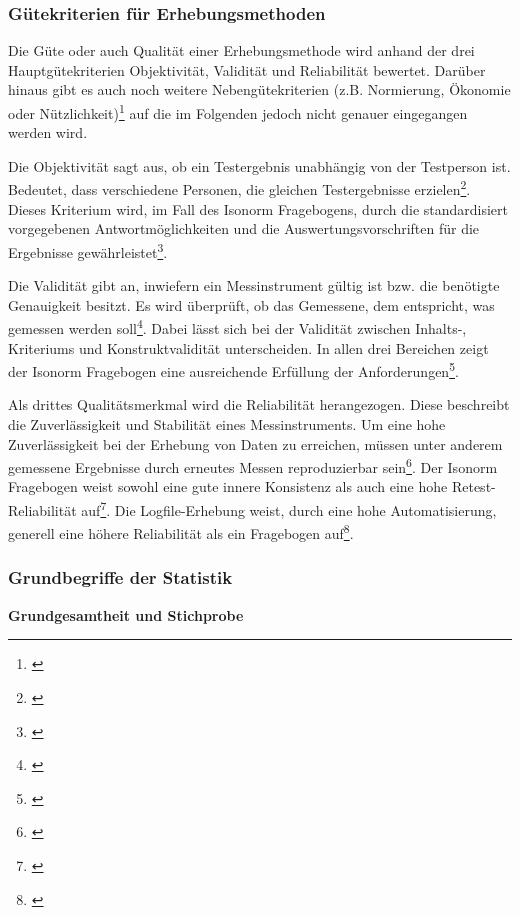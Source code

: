 
\subsubsection{Gütekriterien für Erhebungsmethoden}

Die Güte oder auch Qualität einer Erhebungsmethode wird anhand der drei Hauptgütekriterien Objektivität, Validität und Reliabilität bewertet. Darüber hinaus gibt es auch noch weitere Nebengütekriterien (z.B. Normierung, Ökonomie oder Nützlichkeit)\footnote{\cite[vgl.][Kap. 3.5]{Figl2010}} auf die im Folgenden jedoch nicht genauer eingegangen werden wird.

Die Objektivität sagt aus, ob ein Testergebnis unabhängig von der Testperson ist. Bedeutet, dass verschiedene Personen, die gleichen Testergebnisse erzielen\footnote{\cite[vgl.][Kap. 1]{Himme2007}}. Dieses Kriterium wird, im Fall des Isonorm Fragebogens, durch die standardisiert vorgegebenen Antwortmöglichkeiten und die Auswertungsvorschriften für die Ergebnisse gewährleistet\footnote{\cite[vgl.][Kap. 3.5.1]{Figl2010}}.

Die Validität gibt an, inwiefern ein Messinstrument gültig ist bzw. die benötigte Genauigkeit besitzt. Es wird überprüft, ob das Gemessene, dem entspricht, was gemessen werden soll\footnote{\cite[vgl][Kap. 1]{Himme2007}}. Dabei lässt sich bei der Validität zwischen Inhalts-, Kriteriums und Konstruktvalidität unterscheiden. In allen drei Bereichen zeigt der Isonorm Fragebogen eine ausreichende Erfüllung der Anforderungen\footnote{\cite[vgl.][Kap. 3.5.2]{Figl2010}}.

Als drittes Qualitätsmerkmal wird die Reliabilität herangezogen. Diese beschreibt die Zuverlässigkeit und Stabilität eines Messinstruments. Um eine hohe Zuverlässigkeit bei der Erhebung von Daten zu erreichen, müssen unter anderem gemessene Ergebnisse durch erneutes Messen reproduzierbar sein\footnote{\cite[vgl.][Kap. 1]{Himme2007}}. Der Isonorm Fragebogen weist sowohl eine gute innere Konsistenz als auch eine hohe Retest-Reliabilität auf\footnote{\cite[vgl.][Kap. 3.5.3]{Figl2010}}. Die Logfile-Erhebung weist, durch eine hohe Automatisierung, generell eine höhere Reliabilität als ein Fragebogen auf\footnote{\cite[vgl.][Kap. 65.3]{Baur2014}}.


\subsubsection{Grundbegriffe der Statistik}
\label{sec:grundbegriffeDerStatistik}
\textbf{Grundgesamtheit und Stichprobe}

